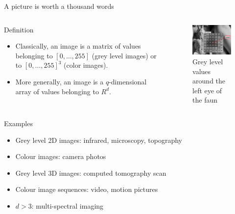 \documentclass[xcolor=pdftex,dvipsnames,table,mathserif]{beamer}
\begin{document}
\begin{frame}{A picture is worth a thousand words}

  \begin{columns}
    \begin{column}{.5\textwidth}
      \begin{block}{Definition}
        \begin{itemize}
        \item Classically, an image is a matrix of values belonging to $[0, \ldots, 255]$ (grey level images) or to $[0, \ldots, 255]^3$ (color images).
        \item More generally, an image is a $q$-dimensional array of values belonging to $R^d$.
        \end{itemize}
      \end{block}

    \end{column}

    \begin{column}{.5\textwidth}
      \begin{figure}
        \centering
        \includegraphics[width=5cm]{../graphics/faune.png}\\
        \tiny{Grey level values around the left eye of the faun}
      \end{figure}

    \end{column}
  \end{columns}

\pause

\begin{block}{Examples}
  \begin{itemize}
  \item Grey level 2D images: infrared, microscopy, topography
  \item Colour images: camera photos
  \item Grey level 3D images: computed tomography scan
  \item Colour image sequences: video, motion pictures
  \item $d > 3$: multi-spectral imaging
  \end{itemize}
\end{block}

\end{frame}
\end{document}
